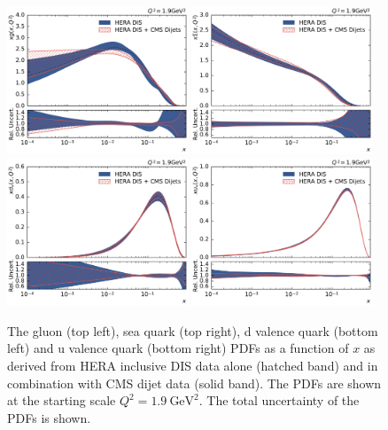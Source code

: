 \begin{figure}[tbp]
  \centering
  \includegraphics[width=0.48\textwidth]{figures/pdf_constraints/pdfcomp_direct_0_1.9.pdf}\hfill%
  \includegraphics[width=0.48\textwidth]{figures/pdf_constraints/pdfcomp_direct_9_1.9.pdf}
  \includegraphics[width=0.48\textwidth]{figures/pdf_constraints/pdfcomp_direct_7_1.9.pdf}\hfill%
  \includegraphics[width=0.48\textwidth]{figures/pdf_constraints/pdfcomp_direct_8_1.9.pdf}
  \caption[Direct comparison of gluon and quark PDFs]{The gluon (top left), sea
  quark (top right), d valence quark (bottom left) and u valence quark (bottom
right) PDFs as a function of $x$ as derived from HERA inclusive DIS data
alone (hatched band) and in combination with CMS dijet data (solid band). The PDFs
are shown at the starting scale $Q^2 = \SI{1.9}{\GeV \squared}$. The total
uncertainty of the PDFs is shown.}
  \label{fig:pdfconstraints:direct:19}
\end{figure}

